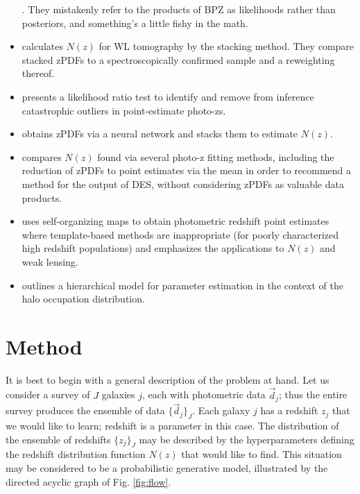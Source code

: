 \documentclass[preprint]{aastex}
\begin{document}
\begin{itemize}
\citet{kel12}.  They mistakenly refer to the products of BPZ as likelihoods 
rather than posteriors, and something's a little fishy in the math.
\item \citet{ben12} calculates $N(z)$ for WL tomography by the stacking method. 
 They compare stacked zPDFs to a spectroscopically confirmed sample and a 
reweighting thereof.
\item \citet{gor13} presents a likelihood ratio test to identify and remove 
from inference catastrophic outliers in point-estimate photo-zs.
\item \citet{bon13} obtains zPDFs via a neural network and stacks them to 
estimate $N(z)$.
\item \citet{bon15} compares $N(z)$ found via several photo-z fitting methods, 
including the reduction of zPDFs to point estimates via the mean in order to 
recommend a method for the output of DES, without considering zPDFs as valuable 
data products.
\item \citet{mas15} uses self-organizing maps to obtain photometric redshift 
point estimates where template-based methods are inappropriate (for poorly 
characterized high redshift populations) and emphasizes the applications to 
$N(z)$ and weak lensing.
\item \citet{mar15} outlines a hierarchical model for parameter estimation in 
the context of the halo occupation distribution.
\end{itemize}

\clearpage
\section{Method}
\label{sec:meth}

It is best to begin with a general description of the problem at hand.  Let us 
consider a survey of $J$ galaxies $j$, each with photometric data 
$\vec{d}_{j}$; thus the entire survey produces the ensemble of data 
$\{\vec{d}_{j}\}_{J}$.  Each galaxy $j$ has a redshift $z_{j}$ that we would 
like to learn; redshift is a parameter in this case.  The distribution of the 
ensemble of redshifts $\{z_{j}\}_{J}$ may be described by the hyperparameters 
defining the redshift distribution function $N(z)$ that would like to find.  
This situation may be considered to be a probabilistic generative model, 
illustrated by the directed acyclic graph of Fig. \ref{fig:flow}.  
\end{document}
